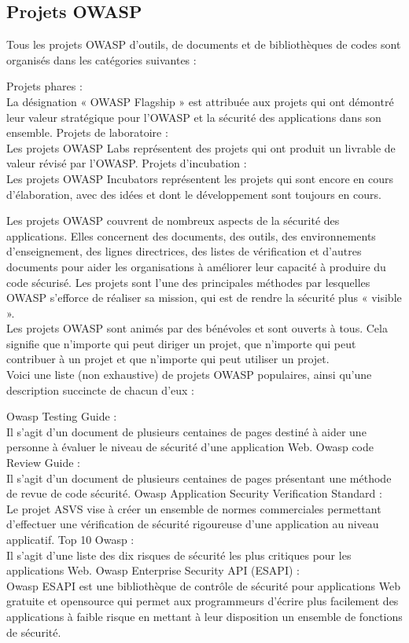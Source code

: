\subsection{Projets OWASP}
Tous les projets OWASP d'outils, de documents et de bibliothèques de codes sont organisés dans les catégories suivantes : 
\begin{itemize}
	\itemcheck Projets phares : \\
	La désignation « OWASP Flagship » est attribuée aux projets qui ont démontré leur valeur stratégique pour l’OWASP et la sécurité des applications dans son ensemble.
	\itemcheck Projets de laboratoire : \\
	Les projets OWASP Labs représentent des projets qui ont produit un livrable de valeur révisé par l’OWASP.
	\itemcheck Projets d'incubation : \\
	Les projets OWASP Incubators représentent les projets qui sont encore en cours d'élaboration, avec des idées et dont le développement sont toujours en cours.
\end{itemize}
Les projets OWASP couvrent de nombreux aspects de la sécurité des applications. Elles concernent des documents, des outils, des environnements d'enseignement, des lignes directrices, des listes de vérification et d'autres documents pour aider les organisations à améliorer leur capacité à produire du code sécurisé. Les projets sont l'une des principales méthodes par lesquelles OWASP s'efforce de réaliser sa mission, qui est de rendre la sécurité plus « visible ».\\
Les projets OWASP sont animés par des bénévoles et sont ouverts à tous. Cela signifie que n'importe qui peut diriger un projet, que n'importe qui peut contribuer à un projet et que n'importe qui peut utiliser un projet. \\
Voici une liste (non exhaustive) de projets OWASP populaires, ainsi qu’une description succincte de chacun d'eux :
\begin{itemize}
	\itemcheck Owasp Testing Guide : \\
	Il s'agit d'un document de plusieurs centaines de pages destiné à aider une personne à évaluer le niveau de sécurité d'une application Web.
	\itemcheck Owasp code Review Guide : \\
	Il s'agit d'un document de plusieurs centaines de pages présentant une méthode de revue de code sécurité.
	\itemcheck Owasp Application Security Verification Standard : \\
	Le projet ASVS vise à créer un ensemble de normes commerciales permettant d'effectuer une vérification de sécurité rigoureuse d’une application au niveau applicatif.
	\itemcheck Top 10 Owasp : \\
	Il s'agit d'une liste des dix risques de sécurité les plus critiques pour les applications Web.
	\itemcheck Owasp Enterprise Security API (ESAPI) : \\ 
	Owasp ESAPI est une bibliothèque de contrôle de sécurité pour applications Web gratuite et opensource qui permet aux programmeurs d'écrire plus facilement des applications à faible risque en mettant à leur disposition un ensemble de fonctions de sécurité.
\end{itemize}
